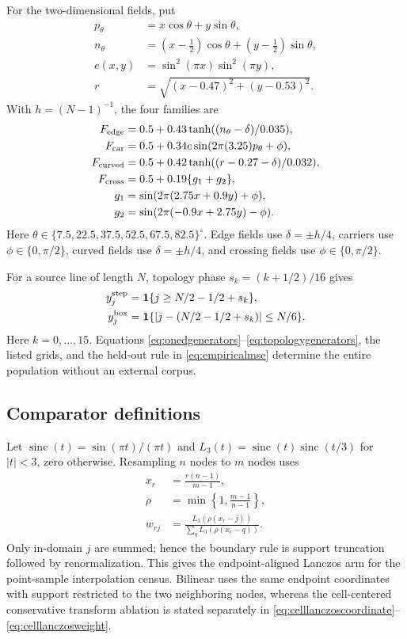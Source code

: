 \documentclass[journal]{IEEEtran}
\begin{document}
For the two-dimensional fields, put
\begin{align}
 p_\theta&=x\cos\theta+y\sin\theta,\nonumber\\
 n_\theta&=(x-\tfrac12)\cos\theta+(y-\tfrac12)\sin\theta,\nonumber\\
 e(x,y)&=\sin^2(\pi x)\sin^2(\pi y),\nonumber\\
 r&=\sqrt{(x-0.47)^2+(y-0.53)^2}.
\end{align}
With \(h=(N-1)^{-1}\), the four families are
\begin{align}
 F_{\rm edge}&=0.5+0.43\tanh((n_\theta-\delta)/0.035),\nonumber\\
 F_{\rm car}&=0.5+0.34e\sin(2\pi(3.25)p_\theta+\phi),\nonumber\\
 F_{\rm curved}&=0.5+0.42\tanh((r-0.27-\delta)/0.032),\nonumber\\
 F_{\rm cross}&=0.5+0.19\{g_1+g_2\},\nonumber\\
 g_1&=\sin(2\pi(2.75x+0.9y)+\phi),\nonumber\\
 g_2&=\sin(2\pi(-0.9x+2.75y)-\phi).
 \label{eq:twodgenerators}
\end{align}
Here
\(\theta\in\{7.5,22.5,37.5,52.5,67.5,82.5\}^{\circ}\). Edge fields
use \(\delta=\pm h/4\), carriers use \(\phi\in\{0,\pi/2\}\), curved
fields use \(\delta=\pm h/4\), and crossing fields use
\(\phi\in\{0,\pi/2\}\).

For a source line of length \(N\), topology phase
\(s_k=(k+1/2)/16\) gives
\begin{align}
 y_j^{\rm step}&=\mathbf 1\{j\geq N/2-1/2+s_k\},\nonumber\\
 y_j^{\rm box}&=\mathbf 1\{|j-(N/2-1/2+s_k)|\leq N/6\}.
 \label{eq:topologygenerators}
\end{align}
Here \(k=0,\ldots,15\).
Equations \eqref{eq:onedgenerators}--\eqref{eq:topologygenerators}, the
listed grids, and the held-out rule in \eqref{eq:empiricalmse} determine the
entire population without an external corpus.

\subsection{Comparator definitions}

Let \(\operatorname{sinc}(t)=\sin(\pi t)/(\pi t)\) and
\(L_3(t)=\operatorname{sinc}(t)\operatorname{sinc}(t/3)\) for
\(|t|<3\), zero otherwise. Resampling \(n\) nodes to \(m\) nodes uses
\begin{align}
 x_r&=\frac{r(n-1)}{m-1},\nonumber\\
 \rho&=\min\!\left\{1,\frac{m-1}{n-1}\right\},\nonumber\\
 w_{rj}&=\frac{L_3(\rho(x_r-j))}{\sum_q L_3(\rho(x_r-q))}.
 \label{eq:lanczosanalysis}
\end{align}
Only in-domain \(j\) are summed; hence the boundary rule is support
truncation followed by renormalization. This gives the endpoint-aligned
Lanczos arm for the point-sample interpolation census. Bilinear uses the same
endpoint coordinates with support restricted to the two neighboring nodes,
whereas the cell-centered conservative transform ablation is stated
separately in
\eqref{eq:celllanczoscoordinate}--\eqref{eq:celllanczosweight}.
\end{document}

